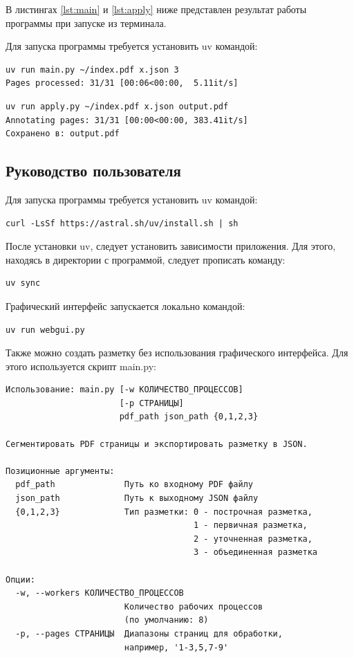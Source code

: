 \newpage

В листингах \ref{lst:main} и \ref{lst:apply} ниже представлен результат работы программы при запуске из терминала.

Для запуска программы требуется установить uv командой:
\begin{lstlisting}[caption={Запуск и результат работы разметки из терминала}, label={lst:main}]
uv run main.py ~/index.pdf x.json 3
Pages processed: 31/31 [00:06<00:00,  5.11it/s]
\end{lstlisting}

\begin{lstlisting}[caption={Запуск и результат применения разметки к PDF из терминала}, label={lst:apply}]
uv run apply.py ~/index.pdf x.json output.pdf
Annotating pages: 31/31 [00:00<00:00, 383.41it/s]
Сохранено в: output.pdf
\end{lstlisting}

\subsection{Руководство пользователя}

Для запуска программы требуется установить uv командой:
\begin{lstlisting}[caption={Установка uv}]
curl -LsSf https://astral.sh/uv/install.sh | sh
\end{lstlisting}

После установки uv, следует установить зависимости приложения.
Для этого, находясь в директории с программой, следует прописать команду:
\begin{lstlisting}[caption={Установка зависимостей}]
uv sync
\end{lstlisting}

Графический интерфейс запускается локально командой:
\begin{lstlisting}[caption={Запуск графического веб-интерфейса}]
uv run webgui.py
\end{lstlisting}

Также можно создать разметку без использования графического интерфейса.
Для этого используется скрипт main.py:
\begin{lstlisting}[caption={Запуск скрипта для создания разметки}]
Использование: main.py [-w КОЛИЧЕСТВО_ПРОЦЕССОВ]
                       [-p СТРАНИЦЫ]
                       pdf_path json_path {0,1,2,3}

Сегментировать PDF страницы и экспортировать разметку в JSON.

Позиционные аргументы:
  pdf_path              Путь ко входному PDF файлу
  json_path             Путь к выходному JSON файлу
  {0,1,2,3}             Тип разметки: 0 - построчная разметка,
                                      1 - первичная разметка,
                                      2 - уточненная разметка,
                                      3 - объединенная разметка

Опции:
  -w, --workers КОЛИЧЕСТВО_ПРОЦЕССОВ
                        Количество рабочих процессов
                        (по умолчанию: 8)
  -p, --pages СТРАНИЦЫ  Диапазоны страниц для обработки,
                        например, '1-3,5,7-9'
\end{lstlisting}

